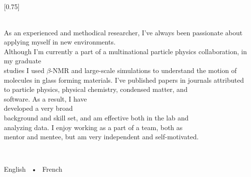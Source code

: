 \documentclass[lighthipster]{simplehipstercv}
\begin{document}
\thispagestyle{empty}

\subsection*{}

\vspace{5.38em}

\setlength{\columnsep}{1.5cm}
[0.75]
\begin{paracol}{2}

\paracolbackgroundoptions


\footnotesize
{\setasidefontcolour
{}

\hfill{}\\[0.5em]

{\footnotesize
As an experienced and methodical researcher, I've always been passionate about applying myself in new environments.\\Although I'm currently a part of a multinational particle physics collaboration, in my graduate \\studies I used $\beta$-NMR and large-scale simulations to understand the motion of molecules in glass forming materials. I've published papers in journals attributed to particle physics, physical chemistry, condensed matter, and \\software. As a result, I have \\developed a very broad \\background and skill set, and am effective both in the lab and \\analyzing data. I enjoy working as a part of a team, both as \\mentor and mentee, but am very independent and self-motivated.\\


}
\bigskip

\hfill{} \\

\vspace{-0.3cm}
\flushright
{
    English ~•~ French

}}
\end{paracol}
\end{document}
